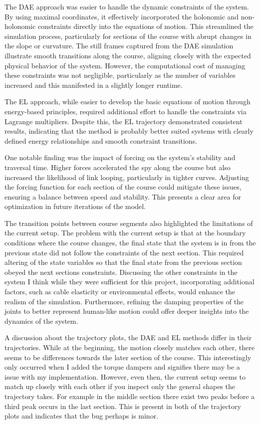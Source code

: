\documentclass{article}
\begin{document}
The DAE approach was easier to handle the dynamic constraints of the system. By using maximal coordinates, it effectively incorporated the holonomic and non-holonomic constraints directly into the equations of motion. This streamlined the simulation process, particularly for sections of the course with abrupt changes in the slope or curvature. The still frames captured from the DAE simulation illustrate smooth transitions along the course, aligning closely with the expected physical behavior of the system. However, the computational cost of managing these constraints was not negligible, particularly as the number of variables increased and this manifested in a slightly longer runtime.

The EL approach, while easier to develop the basic equations of motion through energy-based principles, required additional effort to handle the constraints via Lagrange multipliers. Despite this, the EL trajectory demonstrated consistent results, indicating that the method is probably better suited systems with clearly defined energy relationships and smooth constraint transitions.

One notable finding was the impact of forcing on the system’s stability and traversal time. Higher forces accelerated the spy along the course but also increased the likelihood of link looping, particularly in tighter curves. Adjusting the forcing function for each section of the course could mitigate these issues, ensuring a balance between speed and stability. This presents a clear area for optimization in future iterations of the model.

The transition points between course segments also highlighted the limitations of the current setup. The problem with the current setup is that at the boundary conditions where the course changes, the final state that the system is in from the previous state did not follow the constraints of the next section. This required altering of the state variables so that the final state from the previous section obeyed the next sections constraints. Discussing the other constraints in the system I think while they were sufficient for this project, incorporating additional factors, such as cable elasticity or environmental effects, would enhance the realism of the simulation. Furthermore, refining the damping properties of the joints to better represent human-like motion could offer deeper insights into the dynamics of the system.

A discussion about the trajectory plots, the DAE and EL methods differ in their trajectories. While at the beginning, the motion closely matches each other, there seems to be differences towards the later section of the course. This interestingly only occurred when I added the torque dampers and signifies there may be a issue with my implementation. However, even then, the current setup seems to match up closely with each other if you inspect only the general shapes the trajectory takes. For example in the middle section there exist two peaks before a third peak occurs in the last section. This is present in both of the trajectory plots and indicates that the bug perhaps is minor. 
\end{document}
